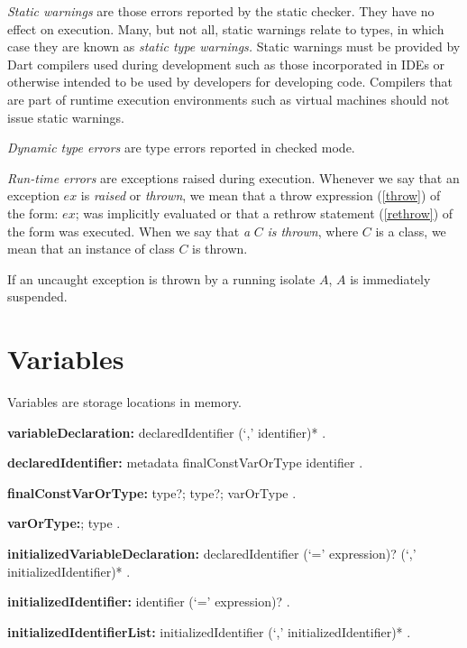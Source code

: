 \documentclass{article}
\newcommand{\code}[1]{{\sf #1}}
\begin{document}
\LMHash{}
{\em Static  warnings} are those errors reported by the static checker. They have no effect on execution. Many, but not all, static warnings relate to types, in which case they are known as {\em static type warnings.} Static warnings must be provided by Dart compilers used during development such as those incorporated in IDEs or otherwise intended to be used by developers for developing code. Compilers that are part of runtime execution environments such as virtual machines should not issue static warnings.

\LMHash{}
{\em Dynamic type errors} are type errors reported in checked mode.

\LMHash{}
{\em Run-time errors} are exceptions raised during execution. Whenever we say that an exception $ex$ is {\em raised} or {\em thrown}, we mean that a throw expression  (\ref{throw}) of the form: \code{\THROW{} $ex$;} was implicitly evaluated or that a rethrow statement (\ref{rethrow}) of the form \code{\RETHROW} was executed. When we say that {\em a} $C$ {\em is thrown}, where $C$ is a class, we mean that an instance of class $C$ is thrown.

\LMHash{}
If an uncaught exception is thrown by a running isolate $A$, $A$ is immediately suspended. 


\section{Variables}

\LMHash{}
Variables are storage locations in memory.  

\begin{grammar}
{\bf variableDeclaration:}
      declaredIdentifier (`,' identifier)*
      .
      
{\bf declaredIdentifier:}
      metadata finalConstVarOrType identifier
    .

{\bf finalConstVarOrType:}\FINAL{} type?;
           \CONST{} type?;
	varOrType
    .
    
 {\bf varOrType:}\VAR{};
	type
    .

 {\bf initializedVariableDeclaration:}
      declaredIdentifier (`=' expression)? (`,' initializedIdentifier)* %
    .

{\bf initializedIdentifier:}
      identifier (`=' expression)? %
    .
    
{\bf initializedIdentifierList:}
      initializedIdentifier (`,' initializedIdentifier)*
    .




  \end{grammar}
\end{document}
